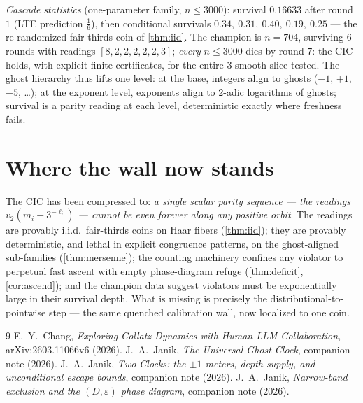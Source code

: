 \documentclass[11pt]{article}
\newcommand{\vt}{v_2}
\begin{document}
\noindent\emph{Cascade statistics} (one-parameter family, $n\le3000$):
survival $0.16633$ after round $1$ (LTE prediction $\tfrac16$), then
conditional survivals $0.34,\ 0.31,\ 0.40,\ 0.19,\ 0.25$ --- the
re-randomized fair-thirds coin of \cref{thm:iid}. The champion is
$n=704$, surviving $6$ rounds with readings $[8,2,2,2,2,2,3]$;
\emph{every} $n\le3000$ dies by round $7$: the CIC holds, with
explicit finite certificates, for the entire $3$-smooth slice tested.
The ghost hierarchy thus lifts one level: at the base, integers align
to ghosts ($-1$, $+1$, $-5$, \dots); at the exponent level, exponents
align to $2$-adic logarithms of ghosts; survival is a parity reading
at each level, deterministic exactly where freshness fails.

\section{Where the wall now stands}

The CIC has been compressed to: \emph{a single scalar parity sequence
--- the readings $\vt(m_i-3^{-\ell_i})$ --- cannot be even forever
along any positive orbit}. The readings are provably i.i.d.\
fair-thirds coins on Haar fibers (\cref{thm:iid}); they are provably
deterministic, and lethal in explicit congruence patterns, on the
ghost-aligned sub-families (\cref{thm:mersenne}); the counting
machinery confines any violator to perpetual fast ascent with empty
phase-diagram refuge (\cref{thm:deficit}, \cref{cor:ascend}); and the
champion data suggest violators must be exponentially large in their
survival depth. What is missing is precisely the
distributional-to-pointwise step --- the same quenched calibration
wall, now localized to one coin.

\begin{thebibliography}{9}
 E.~Y.~Chang, \emph{Exploring Collatz Dynamics with
Human-LLM Collaboration}, arXiv:2603.11066v6 (2026).
 J.~A.~Janik, \emph{The Universal Ghost Clock}, companion
note (2026).
 J.~A.~Janik, \emph{Two Clocks: the $\pm1$ meters, depth
supply, and unconditional escape bounds}, companion note (2026).
\bibitem{nb} J.~A.~Janik, \emph{Narrow-band exclusion and the
$(D,\varepsilon)$ phase diagram}, companion note (2026).
\end{thebibliography}
\end{document}

